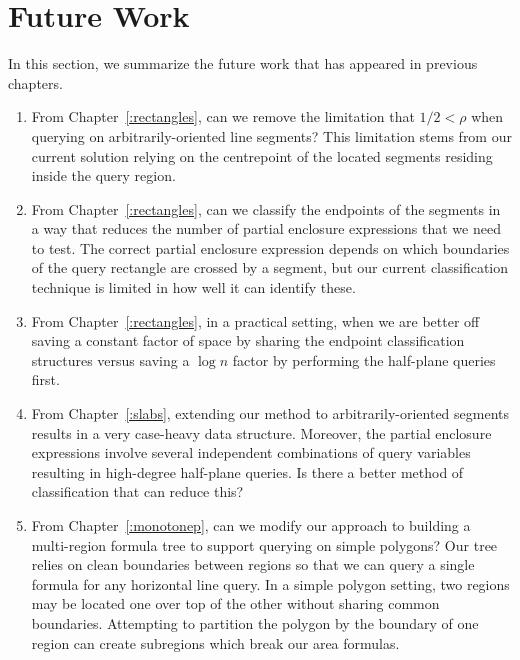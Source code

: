\section{Future Work}
\label{:conclusion:open-problems}

In this section, we summarize the future work that has appeared in previous chapters.

\begin{enumerate}
\item From Chapter~\ref{:rectangles}, can we remove the limitation that $1/2 < \rho$ when querying on arbitrarily-oriented line segments?  
This limitation stems from our current solution relying on the centrepoint of the located segments residing inside the query region.

\item From Chapter~\ref{:rectangles}, can we classify the endpoints of the segments in a way that reduces the number of partial enclosure expressions that we need to test. 
The correct partial enclosure expression depends on which boundaries of the query rectangle are crossed by a segment, but our current classification technique is limited in how well it can identify these.

\item From Chapter~\ref{:rectangles}, in a practical setting, when we are better off saving a constant factor of space by sharing the endpoint classification structures versus saving a $\log{n}$ factor by performing the half-plane queries first.

\item From Chapter~\ref{:slabs}, extending our method to arbitrarily-oriented segments results in a very case-heavy data structure. Moreover, the partial enclosure expressions involve several independent combinations of query variables resulting in high-degree half-plane queries. 
Is there a better method of classification that can reduce this?

\item From Chapter~\ref{:monotonep}, can we modify our approach to building a multi-region formula tree to support querying on simple polygons?  Our tree relies on clean boundaries between regions so that we can query a single formula for any horizontal line query. In a simple polygon setting, two regions may be located one over top of the other without sharing common boundaries.  Attempting to partition the polygon by the boundary of one region can create subregions which break our area formulas.

\end{enumerate}
